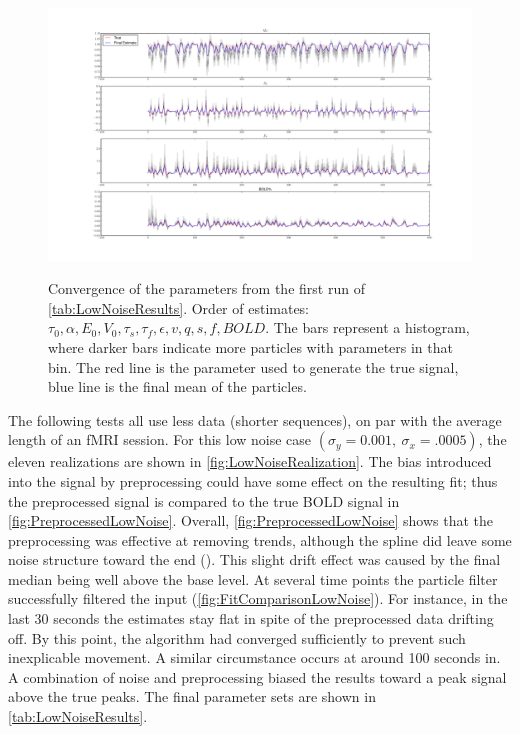 \begin{figure}
\subfigure
{\label{fig:LowNoiseHistc} \includegraphics[clip=true,trim=7cm 3cm 6cm 3cm, width=\textwidth]{images/converge_lownoise3}}
\caption[Convergence of the parameters from the first run of \autoref{tab:LowNoiseResults}.]
{Convergence of the parameters from the first run of \autoref{tab:LowNoiseResults}. 
Order of estimates: $\tau_0, \alpha, E_0, V_0, \tau_s, \tau_f, \epsilon, v,
q, s, f, BOLD$.  The bars represent
a histogram, where darker bars indicate more particles with parameters in that bin. The red 
line is the parameter used to generate the true signal, blue line is the final mean of the
particles.}
\label{fig:LowNoiseHist}
\end{figure}

The following tests all use less data (shorter sequences), on par with
the average length of an \ac{fMRI} session. For this low noise case
$(\sigma_y = 0.001,\ \sigma_x = .0005)$, the eleven realizations are shown in
\autoref{fig:LowNoiseRealization}.
The bias introduced into the signal by preprocessing
could have some effect on the resulting fit; thus the preprocessed signal is compared
to the true \ac{BOLD} signal in \autoref{fig:PreprocessedLowNoise}.
Overall, \autoref{fig:PreprocessedLowNoise} shows that the preprocessing was
effective at removing trends, although the spline did leave some noise 
structure toward the end (). This slight 
drift effect was caused by the final median being well above the base
level.
At several time points the particle filter successfully filtered the input
(\autoref{fig:FitComparisonLowNoise}).
For instance, in the last 30 seconds
the estimates stay flat in spite of the preprocessed data drifting off. By
this point, the algorithm had converged sufficiently to prevent such inexplicable movement.
A similar circumstance occurs at around 100 seconds in. A combination of
noise and preprocessing biased the results toward a peak signal above the true peaks.
The final parameter sets are shown in
\autoref{tab:LowNoiseResults}.


